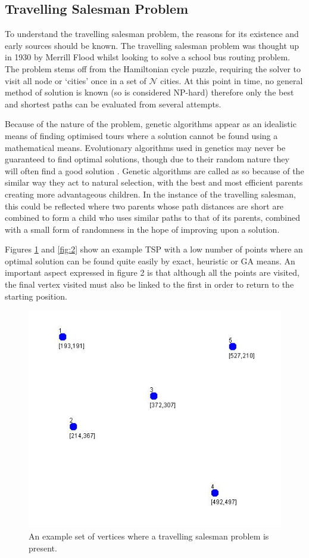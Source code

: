 \documentclass[article]{IEEEtran}
\begin{document}
\subsection{Travelling Salesman Problem}
To understand the travelling salesman problem, the reasons for its existence and early sources should be known. The travelling salesman problem was thought up in 1930 \cite{1} by Merrill Flood whilst looking to solve a school bus routing problem. The problem stems off from the Hamiltonian cycle puzzle, requiring the solver to visit all node or ‘cities’ once in a set of \( \mathcal{N} \) cities. At this point in time, no general method of solution is known \cite{2} (so is considered NP-hard) therefore only the best and shortest paths can be evaluated from several attempts. \par
Because of the nature of the problem, genetic algorithms appear as an idealistic means of finding optimised tours where a solution cannot be found using a mathematical means. Evolutionary algorithms used in genetics may never be guaranteed to find optimal solutions, though due to their random nature they will often find a good solution \cite{3}. Genetic algorithms are called as so because of the similar way they act to natural selection, with the best and most efficient parents creating more advantageous children. In the instance of the travelling salesman, this could be reflected where two parents whose path distances are short are combined to form a child who uses similar paths to that of its parents, combined with a small form of randomness in the hope of improving upon a solution. \par
Figures \ref{fig:1} and \ref{fig:2} show an example TSP with a low number of points where an optimal solution can be found quite easily by exact, heuristic or GA means. An important aspect expressed in figure 2 is that although all the points are visited, the final vertex visited must also be linked to the first in order to return to the starting position.
\begin{figure}
\centering
  \includegraphics[width=.8\linewidth]{images/problem}
  \caption{An example set of vertices where a travelling salesman problem is present.}
  \label{fig:1}
\end{figure}
\end{document}
